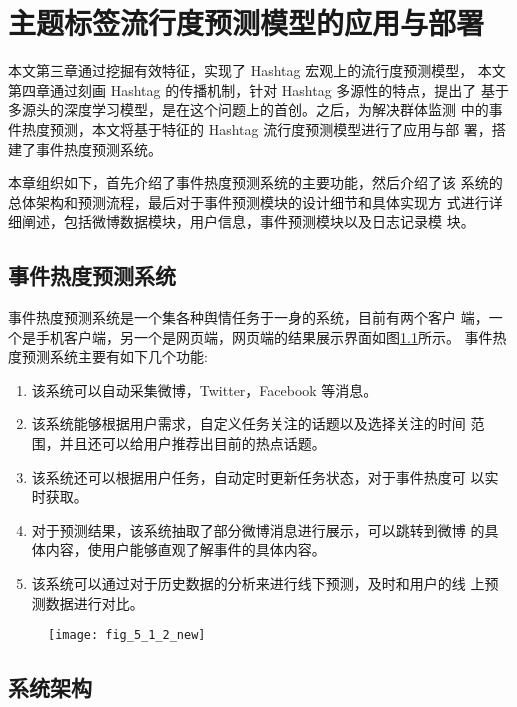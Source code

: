 \chapter{主题标签流行度预测模型的应用与部署}\label{chap:five}

本文第三章通过挖掘有效特征，实现了 Hashtag 宏观上的流行度预测模型， 本文第四章通过刻画 Hashtag 的传播机制，针对 Hashtag 多源性的特点，提出了 基于多源头的深度学习模型，是在这个问题上的首创。之后，为解决群体监测 中的事件热度预测，本文将基于特征的 Hashtag 流行度预测模型进行了应用与部 署，搭建了事件热度预测系统。

本章组织如下，首先介绍了事件热度预测系统的主要功能，然后介绍了该 系统的总体架构和预测流程，最后对于事件预测模块的设计细节和具体实现方 式进行详细阐述，包括微博数据模块，用户信息，事件预测模块以及日志记录模 块。

\section{事件热度预测系统}


事件热度预测系统是一个集各种舆情任务于一身的系统，目前有两个客户 端，一个是手机客户端，另一个是网页端，网页端的结果展示界面如图\ref{fig:figfivetwo}所示。 事件热度预测系统主要有如下几个功能:
\begin{enumerate}
\item 该系统可以自动采集微博，Twitter，Facebook 等消息。
\item 该系统能够根据用户需求，自定义任务关注的话题以及选择关注的时间 范围，并且还可以给用户推荐出目前的热点话题。
\item 该系统还可以根据用户任务，自动定时更新任务状态，对于事件热度可 以实时获取。
\item 对于预测结果，该系统抽取了部分微博消息进行展示，可以跳转到微博 的具体内容，使用户能够直观了解事件的具体内容。
\item 该系统可以通过对于历史数据的分析来进行线下预测，及时和用户的线 上预测数据进行对比。
\end{enumerate}

\begin{figure}[!htbp]
    \centering
    \texttt{[image: fig\_5\_1\_2\_new]}
    \label{fig:figfivetwo}
\end{figure}

\section{系统架构}

